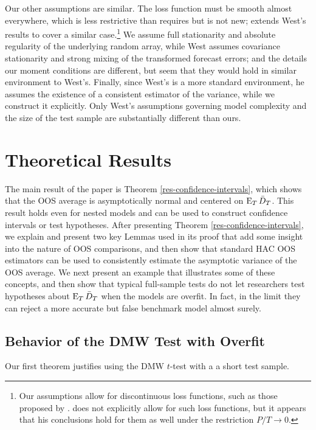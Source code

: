 \documentclass[11pt]{article}
\begin{document}
Our other assumptions are similar.  The loss function must be smooth
almost everywhere, which is less restrictive than \citet{Wes:96}
requires but is not new; \citet{Mcc:00} extends West's results to
cover a similar case.\footnote{Our assumptions allow for discontinuous
  loss functions, such as those proposed by \citet{PeT:92}.
  \citet{Mcc:00} does not explicitly allow for such loss functions,
  but it appears that his conclusions hold for them as well under the
  restriction $P/T \to 0$.}  We assume full stationarity and absolute
regularity of the underlying random array, while West assumes
covariance stationarity and strong mixing of the transformed forecast
errors; and the details our moment conditions are different, but seem
that they would hold in similar environment to West's.  Finally, since
West's is a more standard environment, he assumes the existence of a
consistent estimator of the variance, while we construct it
explicitly.  Only West's assumptions governing model complexity and
the size of the test sample are substantially different than ours.

\section{Theoretical Results}\label{sec:theory}
The main result of the paper is Theorem
\ref{res-confidence-intervals}, which shows that the OOS average is
asymptotically normal and centered on $\operatorname{E}_T \bar{D}_{T}$.  This result holds
even for nested models and can be used to construct confidence
intervals or test hypotheses.  After presenting Theorem
\ref{res-confidence-intervals}, we explain and present two key Lemmas
used in its proof that add some insight into the nature of OOS
comparisons, and then show that standard HAC OOS estimators can be
used to consistently estimate the asymptotic variance of the OOS
average.  We next present an example that illustrates some of these
concepts, and then show that typical full-sample tests do not let
researchers test hypotheses about $\operatorname{E}_{T} \bar{D}_{T}$ when the models are
overfit.  In fact, in the limit they can reject a more accurate but
false benchmark model almost surely.

\subsection{Behavior of the DMW Test with Overfit}\label{sec:oostheory}
Our first theorem justifies using the DMW $t$-test with a a short
test sample.
\end{document}
